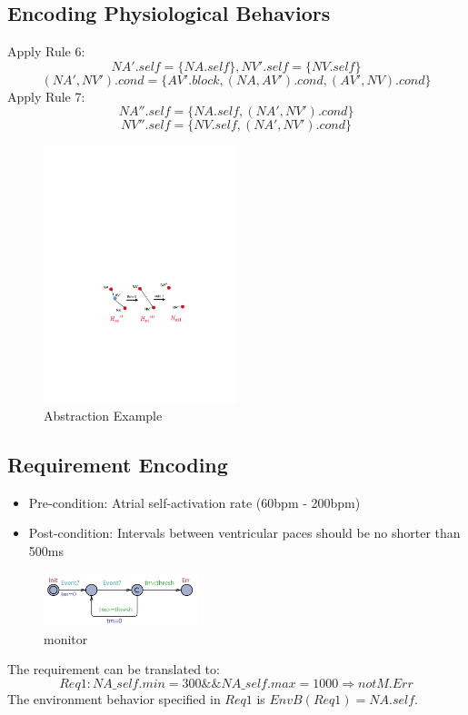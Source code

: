 \subsection{Encoding Physiological Behaviors}
Apply Rule 6:
$$NA'.self=\{NA.self\},NV'.self=\{NV.self\}$$
$$(NA',NV').cond=\{AV'.block,(NA,AV').cond,(AV',NV).cond\}$$
Apply Rule 7:
$$NA''.self=\{NA.self,(NA',NV').cond\}$$
$$NV''.self=\{NV.self,(NA',NV').cond\}$$
\begin{figure}[!t]
		\centering
		\includegraphics[width=0.5\textwidth]{figs/abs_sim.pdf}
		\caption{\small Abstraction Example}
		\label{fig:abs_sim}
\end{figure}

\subsection{Requirement Encoding}
\begin{itemize}
	\item Pre-condition: Atrial self-activation rate (60bpm - 200bpm)
    \item Post-condition: Intervals between ventricular paces should be no shorter than 500ms
\end{itemize}
\begin{figure}[!h]
		\centering
		\includegraphics[width=0.4\textwidth]{figs/monitor.pdf}
		\caption{\small monitor}
		\label{fig:monitor}
\end{figure}
The requirement can be translated to:
$$Req1: NA\_self.min=300 \&\& NA\_self.max=1000 \Rightarrow not M.Err$$
The environment behavior specified in $Req1$ is $EnvB(Req1)=NA.self$.
